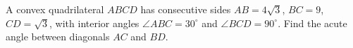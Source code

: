 A convex quadrilateral $ABCD$ has consecutive sides $AB=4\sqrt3$, $BC=9$, $CD=\sqrt3$, with interior angles $\angle ABC=30^\circ$ and $\angle BCD=90^\circ$. Find the acute angle between diagonals $AC$ and $BD$.
